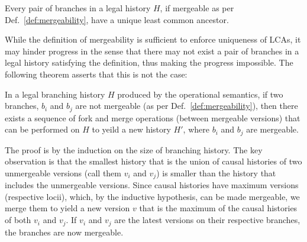\begin{theorem} 
Every pair of branches in a legal history $H$, if mergeable as per
Def.~\ref{def:mergeability}, have a unique least common ancestor.
\end{theorem}

While the definition of mergeability is sufficient to enforce
uniqueness of LCAs, it may hinder progress in the sense that there may
not exist a pair of branches in a legal history satisfying the
definition, thus making the progress impossible. The following theorem
asserts that this is not the case:

\begin{theorem} 
In a legal branching history $H$ produced by the operational
semantics, if two branches, $b_i$ and $b_j$ are not mergeable (as per
Def.~\ref{def:mergeability}), then there exists a sequence of fork and
merge operations (between mergeable versions) that can be performed on
$H$ to yeild a new history $H'$, where $b_i$ and $b_j$ are mergeable.
\end{theorem}

The proof is by the induction on the size of branching history. The
key observation is that the smallest history that is the union of
causal histories of two unmergeable versions (call them $v_i$ and
$v_j$) is smaller than the history that includes the unmergeable
versions. Since causal histories have maximum versions (respective
locii), which, by the inductive hypothesis, can be made mergeable, we
merge them to yield a new version $v$ that is the maximum of the
causal histories of both $v_i$ and $v_j$. If $v_i$ and $v_j$ are the
latest versions on their respective branches, the branches are now
mergeable.


